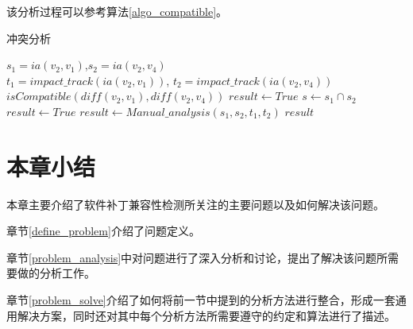 
该分析过程可以参考算法\ref {algo_compatible}。

\begin{algorithm}[H]
	\caption{冲突分析}
	\label{algo_compatible}
	\begin{algorithmic}[1]
		\Require $s_1=ia(v_2,v_1)$,$s_2=ia(v_2,v_4)$\\
				 \quad \quad $t_1=impact\_track(ia(v_2,v_1))$, $t_2=impact\_track(ia(v_2,v_4))$
		\Ensure $isCompatible(diff(v_2,v_1), diff(v_2,v_4))$
			\State $result \gets True$
		\Else
			\State $s \gets s_1 \cap s_2$
				\State $result \gets True$
			\Else				
				\State $result \gets Manual\_analysis(s_1, s_2, t_1, t_2)$
			\EndIf 
		\EndIf
		\Return $result$
	\end{algorithmic}
\end{algorithm}

%


\section{本章小结}
本章主要介绍了软件补丁兼容性检测所关注的主要问题以及如何解决该问题。

章节\ref {define_problem}介绍了问题定义。

章节\ref {problem_analysis}中对问题进行了深入分析和讨论，提出了解决该问题所需要做的分析工作。

章节\ref {problem_solve}介绍了如何将前一节中提到的分析方法进行整合，形成一套通用解决方案，同时还对其中每个分析方法所需要遵守的约定和算法进行了描述。